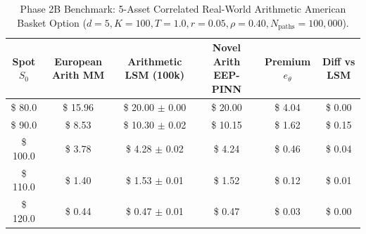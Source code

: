 \begin{table}[h!]
\centering
\small
\caption{Phase 2B Benchmark: 5-Asset Correlated Real-World Arithmetic American Basket Option ($d=5, K=100, T=1.0, r=0.05, \rho=0.40, N_{\text{paths}}=100,000$).}
\label{tab:arithmetic_benchmarks}
\begin{tabular}{@{}cccccc@{}}
\toprule
\textbf{Spot $S_0$} & \textbf{European Arith MM} & \textbf{Arithmetic LSM (100k)} & \textbf{Novel Arith EEP-PINN} & \textbf{Premium $e_\theta$} & \textbf{Diff vs LSM} \\ \midrule
\$ 80.0 & \$ 15.96 & \$ 20.00 $\pm$ 0.00 & \$ 20.00 & \$ 4.04 & \$ 0.00 \\
\$ 90.0 & \$ 8.53 & \$ 10.30 $\pm$ 0.02 & \$ 10.15 & \$ 1.62 & \$ 0.15 \\
\$ 100.0 & \$ 3.78 & \$ 4.28 $\pm$ 0.02 & \$ 4.24 & \$ 0.46 & \$ 0.04 \\
\$ 110.0 & \$ 1.40 & \$ 1.53 $\pm$ 0.01 & \$ 1.52 & \$ 0.12 & \$ 0.01 \\
\$ 120.0 & \$ 0.44 & \$ 0.47 $\pm$ 0.01 & \$ 0.47 & \$ 0.03 & \$ 0.00 \\
\bottomrule
\end{tabular}
\end{table}

